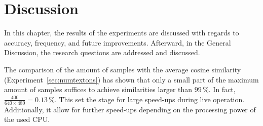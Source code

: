 \chapter{Discussion}
\label{chap:discussion}

In this chapter, the results of the experiments are discussed with regards to accuracy, frequency, and future improvements. Afterward, in the General Discussion, the research questions are addressed and discussed.

The comparison of the amount of samples with the average cosine
similarity (Experiment~\ref{sec:numtextons}) has shown that only a small part of the maximum amount of
samples suffices to achieve similarities larger than $99\,\%$. In
fact, $\frac{400}{640 \times 480} = 0.13\,\%$. This set the stage for
large speed-ups during live operation. Additionally, it allow for further speed-ups depending on the processing power of the used
CPU.
